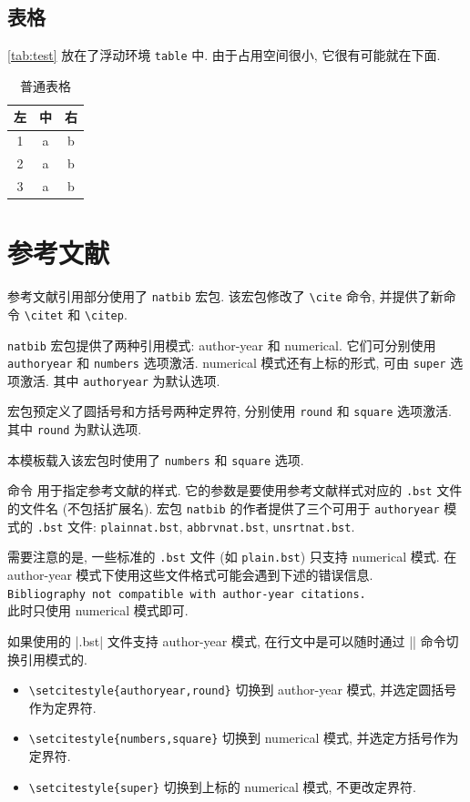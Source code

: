 \subsection{表格}

\autoref{tab:test} 放在了浮动环境 \verb|table| 中.
由于占用空间很小, 它很有可能就在下面.

\begin{table}[!htb]
  \caption{普通表格}
  \label{tab:test}
  \centering
  \begin{tabular}{ccc}
    \toprule
    左 & 中 & 右\\
    \midrule
    1  & a  & b\\
    2  & a  & b\\
    3  & a  & b\\
    \bottomrule
  \end{tabular}
\end{table}

\section{参考文献}
\label{sec:bib}

参考文献引用部分使用了 \verb|natbib| 宏包.
该宏包修改了 \verb|\cite| 命令, 并提供了新命令 \verb|\citet| 和 \verb|\citep|.

\verb|natbib| 宏包提供了两种引用模式: author-year 和 numerical.
它们可分别使用 \verb|authoryear| 和 \verb|numbers| 选项激活.
numerical 模式还有上标的形式, 可由 \verb|super| 选项激活.
其中 \verb|authoryear| 为默认选项.

宏包预定义了圆括号和方括号两种定界符, 分别使用 \verb|round| 和 \verb|square| 选项激活.
其中 \verb|round| 为默认选项.

本模板载入该宏包时使用了 \verb|numbers| 和 \verb|square| 选项.

命令 \verb|| 用于指定参考文献的样式. 它的参数是要使用参考文献样式对应的 \verb|.bst| 文件的文件名 (不包括扩展名). 宏包 \verb|natbib| 的作者提供了三个可用于 \verb|authoryear| 模式的 \verb|.bst| 文件: \verb|plainnat.bst|, \verb|abbrvnat.bst|, \verb|unsrtnat.bst|.

需要注意的是, 一些标准的 \verb|.bst| 文件 (如 \verb|plain.bst|) 只支持 numerical 模式.
在 author-year 模式下使用这些文件格式可能会遇到下述的错误信息.\\
\verb|Bibliography not compatible with author-year citations.|\\
此时只使用 numerical 模式即可.

如果使用的 |.bst| 文件支持 author-year 模式,
在行文中是可以随时通过 |\setcitestyle| 命令切换引用模式的.
\begin{itemize}
  \item
    \verb|\setcitestyle{authoryear,round}| 切换到 author-year 模式,
    并选定圆括号作为定界符.
  \item
    \verb|\setcitestyle{numbers,square}| 切换到 numerical 模式,
    并选定方括号作为定界符.
  \item
    \verb|\setcitestyle{super}| 切换到上标的 numerical 模式,
    不更改定界符.
\end{itemize}

